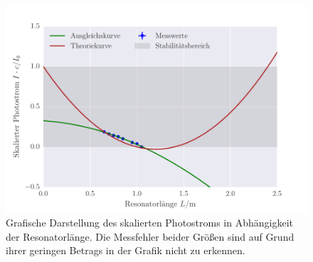 \begin{figure}[!h]
 \centering
 \includegraphics[scale=0.75]{../Grafiken/Stabilitaetsbedingung.pdf}
 \caption{Grafische Darstellung des skalierten Photostroms in Abhängigkeit der Resonatorlänge. Die Messfehler
 	beider Größen sind auf Grund ihrer geringen Betrags in der Grafik nicht zu erkennen.\label{fig:stabilitaetsbedingung}}
 \end{figure} 